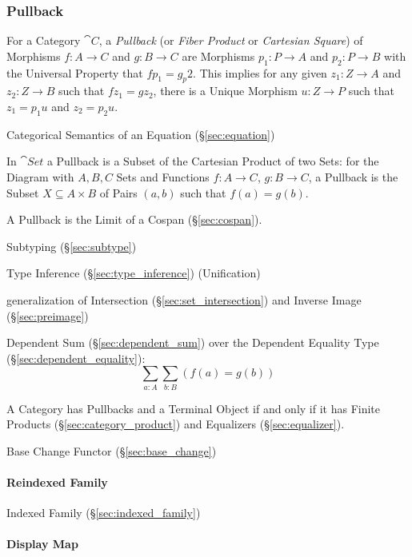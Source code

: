 \subsubsection{Pullback}\label{sec:pullback}

For a Category $\cat{C}$, a \emph{Pullback} (or \emph{Fiber
  Product} or \emph{Cartesian Square}) of Morphisms $f : A \rightarrow
C$ and $g : B \rightarrow C$ are Morphisms $p_1 : P \rightarrow A$ and
$p_2 : P \rightarrow B$ with the Universal Property that $fp_1 =
g_p2$. This implies for any given $z_1 : Z \rightarrow A$ and $z_2 : Z
\rightarrow B$ such that $fz_1 = gz_2$, there is a Unique Morphism $u
: Z \rightarrow P$ such that $z_1 = p_1 u$ and $z_2 = p_2 u$.

Categorical Semantics of an Equation (\S\ref{sec:equation})

In $\cat{Set}$ a Pullback is a Subset of the Cartesian Product of two
Sets: for the Diagram with $A,B,C$ Sets and Functions $f : A
\rightarrow C$, $g : B \rightarrow C$, a Pullback is the Subset $X
\subseteq A \times B$ of Pairs $(a,b)$ such that $f(a) = g(b)$.

A Pullback is the Limit of a Cospan (\S\ref{sec:cospan}).

Subtyping (\S\ref{sec:subtype})

Type Inference (\S\ref{sec:type_inference}) (Unification)

generalization of Intersection (\S\ref{sec:set_intersection}) and
Inverse Image (\S\ref{sec:preimage})

Dependent Sum (\S\ref{sec:dependent_sum}) over the Dependent Equality
Type (\S\ref{sec:dependent_equality}):
\[
  \sum_{a:A} \sum_{b:B} (f(a) = g(b))
\]

A Category has Pullbacks and a Terminal Object if and only if it has
Finite Products (\S\ref{sec:category_product}) and Equalizers
(\S\ref{sec:equalizer}). \cite{awodey06}

Base Change Functor (\S\ref{sec:base_change})



\paragraph{Reindexed Family}\label{sec:reindexed_family}\hfill

Indexed Family (\S\ref{sec:indexed_family})



\paragraph{Display Map}\label{sec:display_map}\hfill


